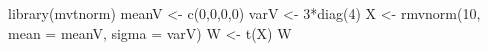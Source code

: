 \begin{Schunk}
\begin{Sinput}
 library(mvtnorm)
 meanV <- c(0,0,0,0)
 varV <- 3*diag(4)
 X <- rmvnorm(10, mean = meanV, sigma = varV)
 W <- t(X) %*% X
 W
\end{Sinput}
\end{Schunk}
